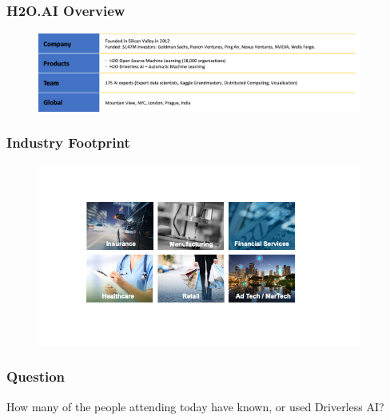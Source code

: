 \documentclass[11pt,
               aspectratio=169,
               hyperref={colorlinks}
               ]{beamer}
\begin{document}
	\begin{frame}
		\frametitle{H2O.AI Overview}
		\begin{figure}[htb]
			\begin{center}
				\includegraphics[width=0.95\textwidth]{img/team.png}
				\label{fig:team}
			\end{center}
		\end{figure}
	\end{frame}
	\begin{frame}
		\frametitle{Industry Footprint}
		\begin{figure}[htb]
			\begin{center}
				\includegraphics[width=0.95\textwidth]{img/industry.png}
				\label{fig:industry}
			\end{center}
		\end{figure}
	\end{frame}

	\begin{frame}
		\frametitle{Question} 
		How many of the people attending today have known, or used Driverless AI?
	\end{frame}
\end{document}
